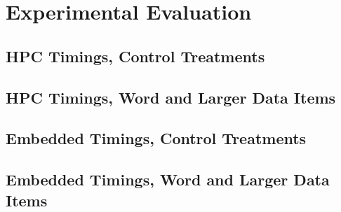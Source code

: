 \section{Experimental Evaluation}
\label{sec:pef-supp}

\subsection{HPC Timings, Control Treatments}


\subsection{HPC Timings, Word and Larger Data Items}


\subsection{Embedded Timings, Control Treatments}


\subsection{Embedded Timings, Word and Larger Data Items}

